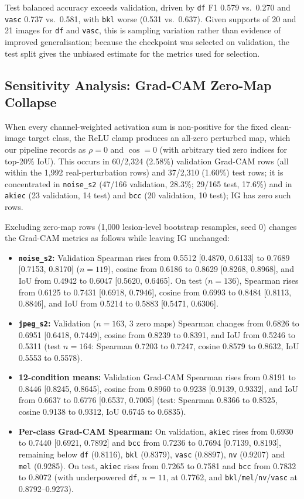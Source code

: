 \documentclass[conference]{IEEEtran}
\begin{document}
Test balanced accuracy exceeds validation, driven by \texttt{df} F1 0.579
vs.\ 0.270 and \texttt{vasc} 0.737 vs.\ 0.581, with \texttt{bkl} worse
(0.531 vs.\ 0.637). Given supports of 20 and 21 images for \texttt{df} and
\texttt{vasc}, this is sampling variation rather than evidence of improved
generalisation; because the checkpoint was selected on validation, the test
split gives the unbiased estimate for the metrics used for selection.

\subsection{Sensitivity Analysis: Grad-CAM Zero-Map Collapse}
When every channel-weighted activation sum is non-positive for the fixed
clean-image target class, the ReLU clamp produces an all-zero perturbed map,
which our pipeline records as $\rho{=}0$ and $\cos{=}0$ (with arbitrary tied
zero indices for top-20\% IoU). This occurs in 60/2{,}324 (2.58\%)
validation Grad-CAM rows (all within the 1{,}992 real-perturbation rows) and
37/2{,}310 (1.60\%) test rows; it is concentrated in \texttt{noise\_s2}
(47/166 validation, 28.3\%; 29/165 test, 17.6\%) and in \texttt{akiec} (23
validation, 14 test) and \texttt{bcc} (20 validation, 10 test); IG has zero
such rows.

Excluding zero-map rows (1{,}000 lesion-level bootstrap resamples, seed 0)
changes the Grad-CAM metrics as follows while leaving IG unchanged:
\begin{itemize}
\item \textbf{\texttt{noise\_s2}:} Validation Spearman rises from 0.5512
[0.4870, 0.6133] to 0.7689 [0.7153, 0.8170] ($n{=}119$), cosine from 0.6186
to 0.8629 [0.8268, 0.8968], and IoU from 0.4942 to 0.6047 [0.5620, 0.6465].
On test ($n{=}136$), Spearman rises from 0.6125 to 0.7431 [0.6918, 0.7946],
cosine from 0.6993 to 0.8484 [0.8113, 0.8846], and IoU from 0.5214 to 0.5883
[0.5471, 0.6306].
\item \textbf{\texttt{jpeg\_s2}:} Validation ($n{=}163$, 3 zero maps)
Spearman changes from 0.6826 to 0.6951 [0.6418, 0.7449], cosine from 0.8239
to 0.8391, and IoU from 0.5246 to 0.5311 (test $n{=}164$: Spearman 0.7203 to
0.7247, cosine 0.8579 to 0.8632, IoU 0.5553 to 0.5578).
\item \textbf{12-condition means:} Validation Grad-CAM Spearman rises from
0.8191 to 0.8446 [0.8245, 0.8645], cosine from 0.8960 to 0.9238 [0.9139,
0.9332], and IoU from 0.6637 to 0.6776 [0.6537, 0.7005] (test: Spearman
0.8366 to 0.8525, cosine 0.9138 to 0.9312, IoU 0.6745 to 0.6835).
\item \textbf{Per-class Grad-CAM Spearman:} On validation, \texttt{akiec}
rises from 0.6930 to 0.7440 [0.6921, 0.7892] and \texttt{bcc} from 0.7236 to
0.7694 [0.7139, 0.8193], remaining below \texttt{df} (0.8116), \texttt{bkl}
(0.8379), \texttt{vasc} (0.8897), \texttt{nv} (0.9207) and \texttt{mel}
(0.9285). On test, \texttt{akiec} rises from 0.7265 to 0.7581 and
\texttt{bcc} from 0.7832 to 0.8072 (with underpowered \texttt{df}, $n{=}11$,
at 0.7762, and \texttt{bkl}/\texttt{mel}/\texttt{nv}/\texttt{vasc} at
0.8792--0.9273).
\end{itemize}
\end{document}
